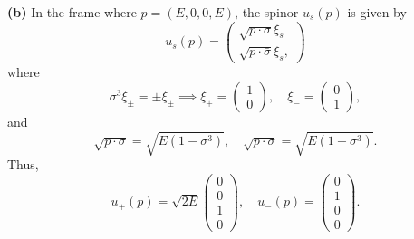 \documentclass[11pt]{article}
\theoremstyle{definition}
\begin{document}
\textbf{(b)} In the frame where $p=(E,0,0,E)$, the spinor $u_s(p)$ is given by 
\begin{equation}
    u_s(p) = \begin{pmatrix}
        \sqrt{p\cdot \sigma}\xi_s\\
        \sqrt{p\cdot \bar{\sigma}}\xi_s,
    \end{pmatrix}
\end{equation}
where
\begin{equation}
    \sigma^3\xi_\pm = \pm\xi_\pm \implies \xi_+ = \begin{pmatrix}
        1\\0
    \end{pmatrix}, \quad \xi_-=\begin{pmatrix}
        0\\1
    \end{pmatrix},
\end{equation}
and
\begin{equation}
    \sqrt{p\cdot \sigma} = \sqrt{E(1 - \sigma^3)}, \quad \sqrt{p\cdot \sigma} = \sqrt{E(1 + \sigma^3)}.
\end{equation}
Thus,
\begin{equation}\boxed{
    u_+(p) = \sqrt{2E}\begin{pmatrix}
        0\\0\\1\\0
    \end{pmatrix},\quad u_-(p)=\begin{pmatrix}
        0\\1\\0\\0
    \end{pmatrix}.}
\end{equation}
\end{document}
